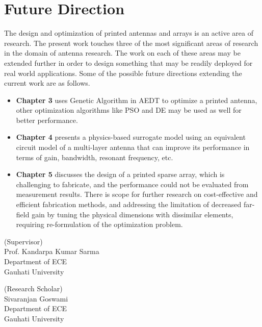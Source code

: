 \documentclass[]{ectguthesis}
\begin{document}
\section{Future Direction}\label{c6sec_future}
The design and optimization of printed antennas and arrays is an active area of research. The present work touches three of the most significant areas of research in the domain of antenna research. The work on each of these areas may be extended further in order to design something that may be readily deployed for real world applications. Some of the possible future directions extending the current work are as follows.
\begin{itemize}
\item \textbf{Chapter 3} uses Genetic Algorithm in AEDT to optimize a printed antenna, other optimization algorithms like PSO and DE may be used as well for better performance.
\item \textbf{Chapter 4} presents a physics-based surrogate model using an equivalent circuit model of a multi-layer antenna that can improve its performance in terms of gain, bandwidth, resonant frequency, etc.
\item \textbf{Chapter 5} discusses the design of a printed sparse array, which is challenging to fabricate, and the performance could not be evaluated from measurement results. There is scope for further research on cost-effective and efficient fabrication methods, and addressing the limitation of decreased far-field gain by tuning the physical dimensions with dissimilar elements, requiring re-formulation of the optimization problem.
\end{itemize} 
\goodbreak
\vspace{1in}

\begin{multicols}{2}
\begin{flushleft}
(Supervisor)\\
Prof. Kandarpa Kumar Sarma\\
Department of ECE\\
Gauhati University
\end{flushleft}

\begin{flushright}
(Research Scholar)\\
Sivaranjan Goswami\\
Department of ECE\\
Gauhati University
\end{flushright}
\end{multicols}
\end{document}
